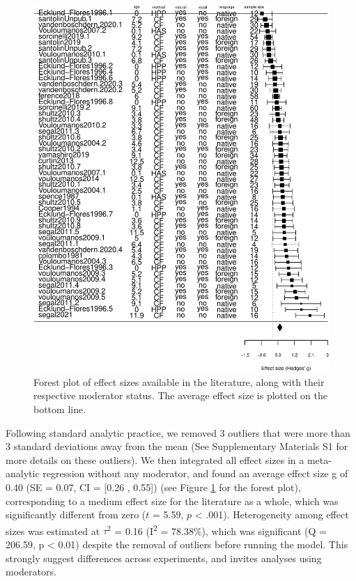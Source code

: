 \documentclass[
  man,mask,floatsintext]{apa6}
\begin{document}
\begin{figure}
\centering
\includegraphics{MA_speech_pref_files/figure-latex/forest-1.pdf}
\caption{\label{fig:forest}Forest plot of effect sizes available in the literature, along with their respective moderator status. The average effect size is plotted on the bottom line.}
\end{figure}

Following standard analytic practice, we removed 3 outliers that were more than 3 standard deviations away from the mean (See Supplementary Materials S1 for more details on these outliers). We then integrated all effect sizes in a meta-analytic regression without any moderator, and found an average effect size g of 0.40 (SE = 0.07, CI = {[}0.26 , 0.55{]}) (see Figure \ref{fig:forest} for the forest plot), corresponding to a medium effect size for the literature as a whole, which was significantly different from zero (\(t\) = 5.59, \(p\) \textless{} .001).
Heterogeneity among effect sizes was estimated at \(\tau^2\) = 0.16 (I\textsuperscript{2} = 78.38\%), which was significant (Q = 206.59, p \textless{} 0.01) despite the removal of outliers before running the model. This strongly suggest differences across experiments, and invites analyses using moderators.
\end{document}
